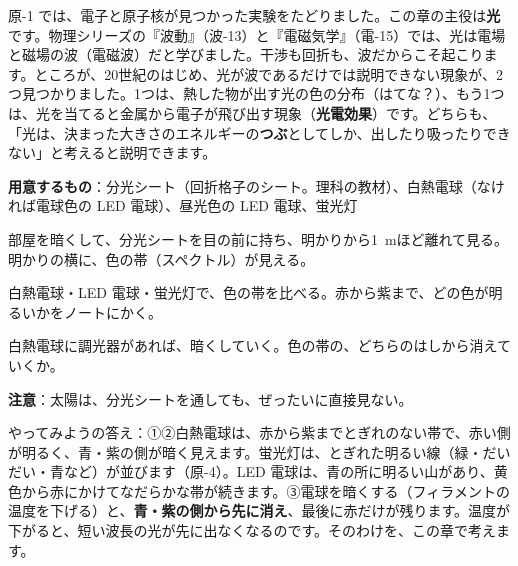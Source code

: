 \noindent 原-1 では、電子と原子核が見つかった実験をたどりました。この章の主役は\textbf{光}です。物理シリーズの『波動』（波-13）と『電磁気学』（電-15）では、光は電場と磁場の波（電磁波）だと学びました。干渉も回折も、波だからこそ起こります。ところが、20世紀のはじめ、光が波であるだけでは説明できない現象が、2つ見つかりました。1つは、熱した物が出す光の色の分布（はてな？）、もう1つは、光を当てると金属から電子が飛び出す現象（\textbf{光電効果}）です。どちらも、「光は、決まった大きさのエネルギーの\textbf{つぶ}としてしか、出したり吸ったりできない」と考えると説明できます。

\begin{yattemiyou}
\textbf{用意するもの}：分光シート（回折格子のシート。理科の教材）、白熱電球（なければ電球色の LED 電球）、昼光色の LED 電球、蛍光灯\par\vspace{2pt}
\begin{enumerate}[label={\bkcircled[bkGreen]{\arabic*}}, leftmargin=2.4\zw, itemsep=1pt, topsep=0pt]
\item 部屋を暗くして、分光シートを目の前に持ち、明かりから\qty{1}{m}ほど離れて見る。明かりの横に、色の帯（スペクトル）が見える。
\item 白熱電球・LED 電球・蛍光灯で、色の帯を比べる。赤から紫まで、どの色が明るいかをノートにかく。
\item 白熱電球に調光器があれば、暗くしていく。色の帯の、どちらのはしから消えていくか。
\end{enumerate}
\par\vspace{2pt}\noindent\textbf{注意}：太陽は、分光シートを通しても、ぜったいに直接見ない。
\end{yattemiyou}

\noindent やってみようの答え：①②白熱電球は、赤から紫までとぎれのない帯で、赤い側が明るく、青・紫の側が暗く見えます。蛍光灯は、とぎれた明るい線（緑・だいだい・青など）が並びます（原-4）。LED 電球は、青の所に明るい山があり、黄色から赤にかけてなだらかな帯が続きます。③電球を暗くする（フィラメントの温度を下げる）と、\textbf{青・紫の側から先に消え}、最後に赤だけが残ります。温度が下がると、短い波長の光が先に出なくなるのです。そのわけを、この章で考えます。

\begin{omoidasou}
\end{omoidasou}

